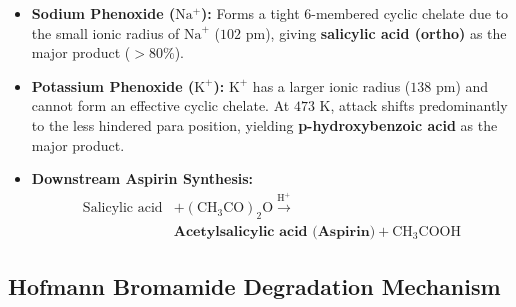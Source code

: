 \documentclass[10pt,twoside,openright]{book}
\begin{document}
\begin{ncertbox}
\begin{itemize}
  \item \textbf{Sodium Phenoxide ($\mathrm{Na^+}$):} Forms a tight 6-membered cyclic chelate due to the small ionic radius of $\mathrm{Na}^+$ ($102\text{ pm}$), giving \textbf{salicylic acid (ortho)} as the major product ($> 80\%$).
  \item \textbf{Potassium Phenoxide ($\mathrm{K^+}$):} $\mathrm{K}^+$ has a larger ionic radius ($138\text{ pm}$) and cannot form an effective cyclic chelate. At $473\text{ K}$, attack shifts predominantly to the less hindered para position, yielding \textbf{p-hydroxybenzoic acid} as the major product.
  \item \textbf{Downstream Aspirin Synthesis:}
  \begin{align}
    \text{Salicylic acid} &+ (\mathrm{CH_3CO})_2\mathrm{O} \xrightarrow{\mathrm{H^+}} \\
    &\textbf{Acetylsalicylic acid (Aspirin)} + \mathrm{CH_3COOH}
  \end{align}
\end{itemize}
\end{ncertbox}

\subsection{Hofmann Bromamide Degradation Mechanism}
\end{document}
